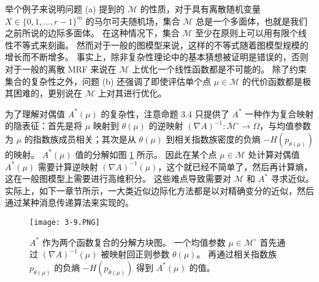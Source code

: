 举个例子来说明问题 (a) 提到的 $\mathcal{M}$ 的性质，对于具有离散随机变量 $X \in \{0, 1, \dots, r-1\}^m$ 的马尔可夫随机场，集合 $\mathcal{M}$ 总是一个多面体，也就是我们之前所说的边际多面体。
在这种情况下，集合 $\mathcal{M}$ 至少在原则上可以用有限个线性不等式来刻画。
然而对于一般的图模型来说，这样的不等式随着图模型规模的增长而不断增多。
事实上，除非复杂性理论中的基本猜想被证明是错误的，否则对于一般的离散 MRF 来说在 $\mathcal{M}$ 上优化一个线性函数都是不可能的。
除了约束集合的复杂性之外，问题 (b) 还强调了即使评估单个点 $\mu \in \mathcal{M}$ 的代价函数都是极其困难的，更别说在 $\mathcal{M}$ 上对其进行优化。

为了理解对偶值 $A^*(\mu)$ 的复杂性，注意命题 3.4 只提供了 $A^*$ 一种作为复合映射的隐表征：首先是将 $\mu$ 映射到 $\theta(\mu)$ 的逆映射 $(\nabla A)^{-1}: \mathcal{M}^\circ \to \Omega$，与均值参数为 $\mu$ 的指数族成员相关；其次是从 $\theta(\mu)$ 到相关指数族密度的负熵 $-H(p_{\theta(\mu)})$ 的映射。
$A^*(\mu)$ 值的分解如图 \ref{fig:3-9} 所示。
因此在某个点 $\mu \in \mathcal{M}$ 处计算对偶值 $A^*(\mu)$ 需要计算逆映射 $(\nabla A)^{-1}(\mu)$，这个就已经不简单了，然后再计算熵，这在一般图模型上需要进行高维积分。
这些难点导致需要对 $\mathcal{M}$ 和 $A^*$ 寻求近似。
实际上，如下一章节所示，一大类近似边际化方法都是以对精确变分的近似，然后通过某种消息传递算法来实现的。

\begin{figure}[htbp]
    \centering
    \texttt{[image: 3-9.PNG]}
    \caption{
        $A^*$ 作为两个函数复合的分解方块图。
        一个均值参数 $\mu \in \mathcal{M}^\circ$ 首先通过 $(\nabla A)^{-1}(\mu)$ 被映射回正则参数 $\theta(\mu)$。
        再通过相关指数族 $p_{\theta(\mu)}$ 的负熵 $-H(p_{\theta(\mu)})$ 得到 $A^*(\mu)$ 的值。
    }\label{fig:3-9}
\end{figure}


